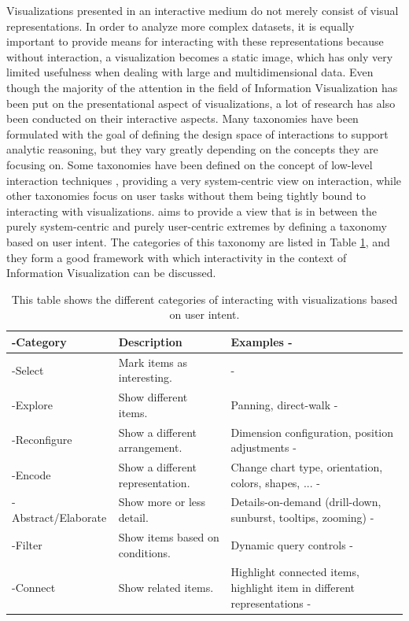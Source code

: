 Visualizations presented in an interactive medium do not merely consist of visual representations. In order to analyze more complex datasets, it is equally important to provide means for interacting with these representations because without interaction, a visualization becomes a static image, which has only very limited usefulness when dealing with large and multidimensional data. Even though the majority of the attention in the field of Information Visualization has been put on the presentational aspect of visualizations, a lot of research has also been conducted on their interactive aspects. Many taxonomies have been formulated with the goal of defining the design space of interactions to support analytic reasoning, but they vary greatly depending on the concepts they are focusing on. Some taxonomies have been defined on the concept of low-level interaction techniques \parencite{TheEyesHaveIt,GrammarOfGraphics}, providing a very system-centric view on interaction, while other taxonomies focus on user tasks \parencite{LowLevelComponentsOfAnalyticActivity} without them being tightly bound to interacting with visualizations. \cite{RoleOfInteractionInInformationVisualization} aims to provide a view that is in between the purely system-centric and purely user-centric extremes by defining a taxonomy based on user intent. The categories of this taxonomy are listed in Table \ref{tab:UserIntentCategories}, and they form a good framework with which interactivity in the context of Information Visualization can be discussed. 

\begin{table}[tp]
\tablestretch
{}
\centering
\begin{tabularx}{\linewidth}{>{\kern-\tabcolsep}lXX<{\kern-\tabcolsep}}
\toprule
Category & Description & Examples \\
\midrule
Select & Mark items as interesting. & \\
Explore & Show different items. & Panning, direct-walk \\
Reconfigure & Show a different arrangement. & Dimension configuration, position adjustments \\
Encode & Show a different representation. & Change chart type, orientation, colors, shapes, ... \\
Abstract/Elaborate & Show more or less detail. & Details-on-demand (drill-down, sunburst, tooltips, zooming) \\
Filter & Show items based on conditions. & Dynamic query controls \\
Connect & Show related items. & Highlight connected items, highlight item in different representations \\
\bottomrule
\end{tabularx}
\caption[Categories of Interaction Based on User Intent]{
  This table shows the different categories of interacting with visualizations based on user intent.
}
\label{tab:UserIntentCategories}
\end{table}




